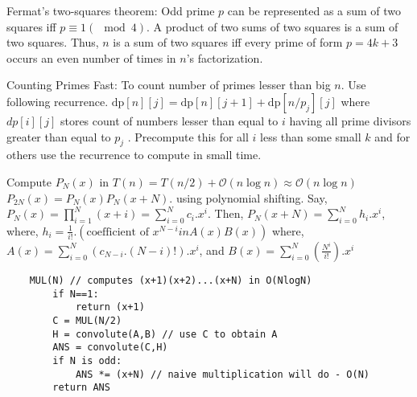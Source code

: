 Fermat’s two-squares theorem: Odd prime $p$ can be represented as a sum of two squares iff
$p \equiv 1 (\mod 4)$. A product of two sums of two squares is a sum of two squares. Thus, $n$ is a sum of
two squares iff every prime of form $p = 4k + 3$ occurs an even number of times in $n$’s factorization.

Counting Primes Fast:  To count number of primes lesser than big $n$. Use following recurrence.
$\text{dp}[n][j] =\text{dp}[n][j + 1] + \text{dp}[n/p_j][j]$ where $dp[i][j]$ stores count of numbers lesser than equal to $i$
having all prime divisors greater than equal to $p_j$ . Precompute this for all $i$ less than some small $k$
and for others use the recurrence to compute in small time.

Compute $P_N(x)$ in $T(n)=T(n/2)+\mathcal{O}(n\log n)\approx \mathcal{O}(n\log n)$ $P_{2N}(x) = P_{N}(x)P_{N}(x+N)$. using polynomial shifting. Say, $P_N(x) = \prod \limits_{i=1}^N (x+i) = \sum_{i=0}^N c_i.x^i$.
Then, $P_N(x+N) = \sum_{i=0}^N h_i.x^i$, where, $h_i = \frac{1}{i!} . (\text{coefficient of } x^{N-i} in A(x)B(x))$ where, $A(x) = \sum \limits_{i=0}^{N} (c_{N-i}.(N-i)!) . x^i$, and $B(x) = \sum \limits_{i=0}^{N} \left( \frac {N^i}{i!} \right) . x^i$

\begin{verbatim}
    MUL(N) // computes (x+1)(x+2)...(x+N) in O(NlogN)
        if N==1:
            return (x+1)
        C = MUL(N/2)
        H = convolute(A,B) // use C to obtain A
        ANS = convolute(C,H)
        if N is odd:
            ANS *= (x+N) // naive multiplication will do - O(N)
        return ANS
\end{verbatim}